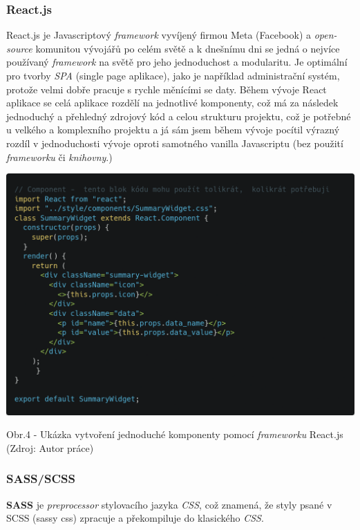 \documentclass[12pt,a4paper]{report}
\begin{document}
  \subsubsection{React.js}
  React.js je Javascriptový \emph{framework} vyvíjený firmou Meta (Facebook) a \emph{open-source} komunitou
  vývojářů po celém světě a k dnešnímu dni se jedná o nejvíce používaný \emph{framework} na světě pro
  jeho jednoduchost a modularitu.
  Je optimální pro tvorby \emph{SPA} (single page aplikace), jako je například administrační systém, protože
  velmi dobře pracuje s rychle měnícími se daty. Během vývoje React aplikace se celá aplikace
  rozdělí na jednotlivé komponenty, což má za následek jednoduchý a přehledný zdrojový kód a
  celou strukturu projektu, což je potřebné u velkého a komplexního projektu a já sám jsem během
  vývoje pocítil výrazný rozdíl v jednoduchosti vývoje oproti samotného vanilla Javascriptu (bez
  použití \emph{frameworku} či \emph{knihovny}.)

  \vspace*{0.5cm}
  \noindent\includegraphics[width=\linewidth]{reactCodeblock.png}
  \begin{center}
    Obr.4 - Ukázka vytvoření jednoduché komponenty pomocí \emph{frameworku} React.js \\
    (Zdroj: Autor práce)
  \end{center}
  \vspace*{0.5cm}

  \subsubsection{SASS/SCSS}
  \textbf{SASS} je \emph{preprocessor} stylovacího jazyka \emph{CSS}, což znamená, že styly psané v SCSS (sassy css)
  zpracuje a překompiluje do klasického \emph{CSS}.
  
\end{document}
